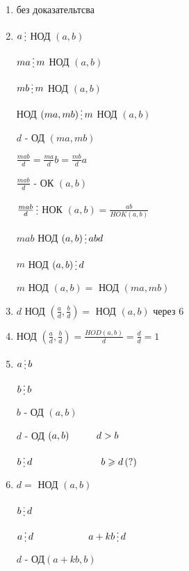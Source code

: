 \documentclass[12pt]{article}
\begin{document}
\begin{enumerate}
        \item без доказательтсва\par
        \item $a \mathop{\raisebox{-2pt}{\vdots}}$ НОД $(a,b)$\par
        $ma \mathop{\raisebox{-2pt}{\vdots}} m$ НОД $(a,b)$\par
        $mb \mathop{\raisebox{-2pt}{\vdots}} m$ НОД $ (a,b)$\par
        НОД $(ma, mb) \mathop{\raisebox{-2pt}{\vdots}} m$ НОД $(a,b)$\par
        $d$ - ОД $(ma,mb)$\par
        $\frac{mab}{d} = \frac{ma}{d}b = \frac{mb}{d}a$\par
        $\frac{mab}{d}$ - ОК $(a,b)$\par
        $\frac{mab}{d} \mathop{\raisebox{-2pt}{\vdots}}$ НОК $(a,b) = \frac{ab}{HOK(a,b)}$\par
        $mab$ НОД $(a,b) \mathop{\raisebox{-2pt}{\vdots}} abd$\par
        $m$ НОД $(a,b) \mathop{\raisebox{-2pt}{\vdots}} d$\par
        $m$ НОД $(a,b) =$ НОД $(ma,mb)$\par
        \item $d$ НОД $(\frac{a}{d}, \frac{b}{d}) =$ НОД $(a,b)$ через 6\par
        \item НОД $(\frac{a}{d}, \frac{b}{d}) = \frac{HOD(a,b)}{d} = \frac{d}{d} = 1$\par
        \item $a \mathop{\raisebox{-2pt}{\vdots}} b$\par
        $b \mathop{\raisebox{-2pt}{\vdots}} b$\par
        $b$ - ОД $(a,b)$\par
        $d$ - ОД $(a,b) \hspace{1 cm} d > b$\par
        $b \mathop{\raisebox{-2pt}{\vdots}} d \hspace{2.5 cm} b \geqslant d \, (?)$\par
        \item $d =$ НОД $(a,b)$\par
        $b \mathop{\raisebox{-2pt}{\vdots}} d$\par
        $a \mathop{\raisebox{-2pt}{\vdots}} d \hspace{2 cm} a + kb \mathop{\raisebox{-2pt}{\vdots}} d$\par
        $d$ - ОД$(a+kb, b)$\par

\end{enumerate}
\end{document}
